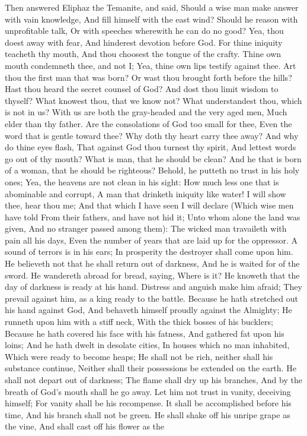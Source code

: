 Then answered Eliphaz the Temanite, and said,  Should a wise man make answer with vain knowledge, And fill himself with the east wind?  Should he reason with unprofitable talk, Or with speeches wherewith he can do no good?  Yea, thou doest away with fear, And hinderest devotion before God.  For thine iniquity teacheth thy mouth, And thou choosest the tongue of the crafty.  Thine own mouth condemneth thee, and not I; Yea, thine own lips testify against thee.  Art thou the first man that was born? Or wast thou brought forth before the hills?  Hast thou heard the secret counsel of God? And dost thou limit wisdom to thyself?  What knowest thou, that we know not? What understandest thou, which is not in us?  With us are both the gray-headed and the very aged men, Much elder than thy father.  Are the consolations of God too small for thee, Even the word that is gentle toward thee?  Why doth thy heart carry thee away? And why do thine eyes flash,  That against God thou turnest thy spirit, And lettest words go out of thy mouth?  What is man, that he should be clean? And he that is born of a woman, that he should be righteous?  Behold, he putteth no trust in his holy ones; Yea, the heavens are not clean in his sight:  How much less one that is abominable and corrupt, A man that drinketh iniquity like water!  I will show thee, hear thou me; And that which I have seen I will declare  (Which wise men have told From their fathers, and have not hid it;  Unto whom alone the land was given, And no stranger passed among them):  The wicked man travaileth with pain all his days, Even the number of years that are laid up for the oppressor.  A sound of terrors is in his ears; In prosperity the destroyer shall come upon him.  He believeth not that he shall return out of darkness, And he is waited for of the sword.  He wandereth abroad for bread, saying, Where is it? He knoweth that the day of darkness is ready at his hand.  Distress and anguish make him afraid; They prevail against him, as a king ready to the battle.  Because he hath stretched out his hand against God, And behaveth himself proudly against the Almighty;  He runneth upon him with a stiff neck, With the thick bosses of his bucklers;  Because he hath covered his face with his fatness, And gathered fat upon his loins;  And he hath dwelt in desolate cities, In houses which no man inhabited, Which were ready to become heaps;  He shall not be rich, neither shall his substance continue, Neither shall their possessions be extended on the earth.  He shall not depart out of darkness; The flame shall dry up his branches, And by the breath of God’s mouth shall he go away.  Let him not trust in vanity, deceiving himself; For vanity shall be his recompense.  It shall be accomplished before his time, And his branch shall not be green.  He shall shake off his unripe grape as the vine, And shall cast off his flower as the 